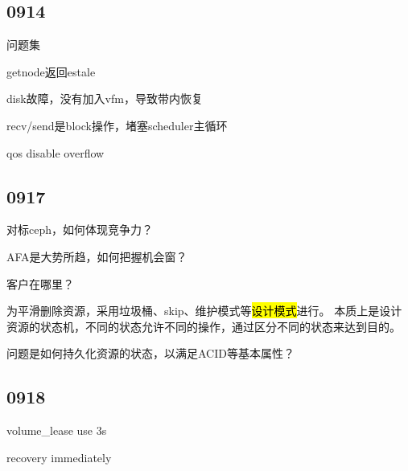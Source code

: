 \subsection{0914}

问题集
\begin{enumbox}
\item getnode返回estale
\item disk故障，没有加入vfm，导致带内恢复
\item recv/send是block操作，堵塞scheduler主循环
\item qos disable overflow
\end{enumbox}

\subsection{0917}

\begin{enumbox}
\item 对标ceph，如何体现竞争力？
\item AFA是大势所趋，如何把握机会窗？
\item 客户在哪里？
\end{enumbox}

为平滑删除资源，采用垃圾桶、skip、维护模式等\hl{设计模式}进行。
本质上是设计资源的状态机，不同的状态允许不同的操作，通过区分不同的状态来达到目的。

问题是如何持久化资源的状态，以满足ACID等基本属性？

\subsection{0918}

\begin{enumbox}
\item volume\_lease use 3s
\item recovery immediately
\end{enumbox}
